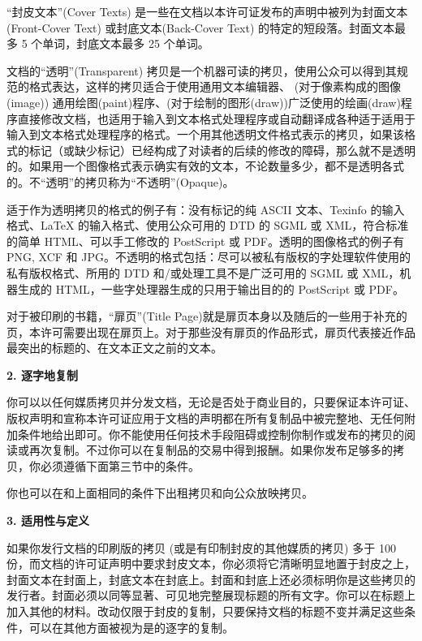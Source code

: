 ``封皮文本''(Cover Texts) 是一些在文档以本许可证发布的声明中被列为封面文本(Front-Cover Text) 或封底文本(Back-Cover Text) 的特定的短段落。封面文本最多 5 个单词，封底文本最多 25 个单词。

文档的``透明''(Transparent) 拷贝是一个机器可读的拷贝，使用公众可以得到其规范的格式表达，这样的拷贝适合于使用通用文本编辑器、 (对于像素构成的图像(image)) 通用绘图(paint)程序、(对于绘制的图形(draw))广泛使用的绘画(draw)程序直接修改文档，也适用于输入到文本格式处理程序或自动翻译成各种适于适用于输入到文本格式处理程序的格式。一个用其他透明文件格式表示的拷贝，如果该格式的标记（或缺少标记）已经构成了对读者的后续的修改的障碍，那么就不是透明的。如果用一个图像格式表示确实有效的文本，不论数量多少，都不是透明各式的。不``透明''的拷贝称为``不透明''(Opaque)。

适于作为透明拷贝的格式的例子有：没有标记的纯 ASCII 文本、Texinfo 的输入格式、LaTeX 的输入格式、使用公众可用的 DTD 的 SGML 或 XML，符合标准的简单 HTML、可以手工修改的 PostScript 或 PDF。透明的图像格式的例子有 PNG, XCF 和 JPG。不透明的格式包括：尽可以被私有版权的字处理软件使用的私有版权格式、所用的 DTD 和/或处理工具不是广泛可用的 SGML 或 XML，机器生成的 HTML，一些字处理器生成的只用于输出目的的 PostScript 或 PDF。

对于被印刷的书籍，``扉页''(Title Page)就是扉页本身以及随后的一些用于补充的页，本许可需要出现在扉页上。对于那些没有扉页的作品形式，扉页代表接近作品最突出的标题的、在文本正文之前的文本。


\begin{center}
{\Large\bf 2. 逐字地复制\par}
\end{center}

你可以以任何媒质拷贝并分发文档，无论是否处于商业目的，只要保证本许可证、版权声明和宣称本许可证应用于文档的声明都在所有复制品中被完整地、无任何附加条件地给出即可。你不能使用任何技术手段阻碍或控制你制作或发布的拷贝的阅读或再次复制。不过你可以在复制品的交易中得到报酬。如果你发布足够多的拷贝，你必须遵循下面第三节中的条件。

你也可以在和上面相同的条件下出租拷贝和向公众放映拷贝。

\begin{center}
{\Large\bf 3. 适用性与定义\par}
\end{center}


如果你发行文档的印刷版的拷贝 (或是有印制封皮的其他媒质的拷贝) 多于 100 份，而文档的许可证声明中要求封皮文本，你必须将它清晰明显地置于封皮之上，封面文本在封面上，封底文本在封底上。封面和封底上还必须标明你是这些拷贝的发行者。封面必须以同等显著、可见地完整展现标题的所有文字。你可以在标题上加入其他的材料。改动仅限于封皮的复制，只要保持文档的标题不变并满足这些条件，可以在其他方面被视为是的逐字的复制。

